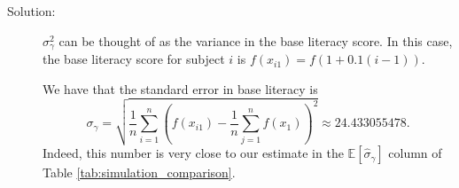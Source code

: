 \documentclass[11pt, letterpaper]{article}
\begin{document}
\begin{enumerate}[(a)]
  \begin{description}
  \item[Solution:] $\sigma_\gamma^2$ can be thought of as the variance in the
    base literacy score. In this case, the base literacy score for subject $i$
    is $f\left(x_{i1}\right) = f\left(1+0.1(i-1)\right)$.

    We have that the standard error in base literacy is
    \begin{equation}
      \sigma_\gamma = \sqrt{\frac{1}{n}\sum_{i=1}^n\left(
          f\left(x_{i1}\right) - \frac{1}{n}\sum_{j=1}^nf\left(x_{1}\right)
        \right)^2} \approx 24.433055478.
      \label{eqn:sigma_gamma}
    \end{equation}
    Indeed, this number is very close to our estimate in the
    $\mathbb{E}\left[\hat{\sigma}_\gamma\right]$ column of Table
    \ref{tab:simulation_comparison}.
  \end{description}
  
\end{enumerate}
\end{document}
